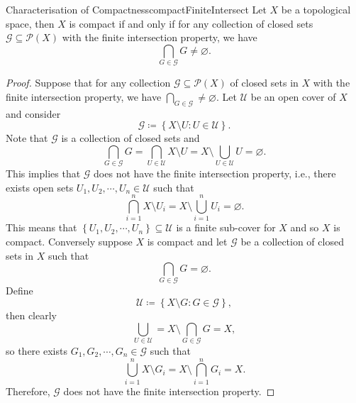 \documentclass[math]{amznotes}
\theoremstyle{remark}
\begin{document}
\begin{probox}{Characterisation of Compactness}{compactFiniteIntersect}
    Let $X$ be a topological space, then $X$ is compact if and only if for any collection of closed sets $\mathcal{G} \subseteq \mathcal{P}\left(X\right)$ with the finite intersection property, we have 
    \begin{equation*}
        \bigcap_{G \in \mathcal{G}}G \neq \varnothing.
    \end{equation*}
    \tcblower
    \begin{proof}
        Suppose that for any collection $\mathcal{G} \subseteq \mathcal{P}\left(X\right)$ of closed sets in $X$ with the finite intersection property, we have $\bigcap_{G \in \mathcal{G}} \neq \varnothing$. Let $\mathcal{U}$ be an open cover of $X$ and consider 
        \begin{equation*}
            \mathcal{G} \coloneqq \left\{X \setminus U \colon U \in \mathcal{U}\right\}.
        \end{equation*}
        Note that $\mathcal{G}$ is a collection of closed sets and 
        \begin{equation*}
            \bigcap_{G \in \mathcal{G}}G = \bigcap_{U \in \mathcal{U}}X \setminus U = X \setminus \bigcup_{U \in \mathcal{U}}U = \varnothing.
        \end{equation*}
        This implies that $\mathcal{G}$ does not have the finite intersection property, i.e., there exists open sets $U_1, U_2, \cdots, U_n \in \mathcal{U}$ such that 
        \begin{equation*}
            \bigcap_{i = 1}^nX \setminus U_i = X \setminus \bigcup_{i = 1}^nU_i = \varnothing.
        \end{equation*}
        This means that $\left\{U_1, U_2, \cdots, U_n\right\} \subseteq \mathcal{U}$ is a finite sub-cover for $X$ and so $X$ is compact. Conversely suppose $X$ is compact and let $\mathcal{G}$ be a collection of closed sets in $X$ such that 
        \begin{equation*}
            \bigcap_{G \in \mathcal{G}}G = \varnothing.
        \end{equation*}
        Define 
        \begin{equation*}
            \mathcal{U} \coloneqq \left\{X \setminus G \colon G \in \mathcal{G}\right\},
        \end{equation*}
        then clearly 
        \begin{equation*}
            \bigcup_{U \in \mathcal{U}} = X \setminus \bigcap_{G \in \mathcal{G}}G = X,
        \end{equation*}
        so there exists $G_1, G_2, \cdots, G_n \in \mathcal{G}$ such that 
        \begin{equation*}
            \bigcup_{i = 1}^nX \setminus G_i = X \setminus \bigcap_{i = 1}^nG_i = X.
        \end{equation*}
        Therefore, $\mathcal{G}$ does not have the finite intersection property.
    \end{proof}
\end{probox}
\end{document}
